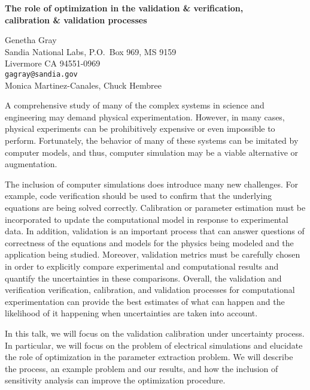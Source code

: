 \documentclass{report}
\begin{document}

\begin{center}
{\large
{\bf The role of optimization in the validation \& verification, \\
calibration \& validation processes}}

	Genetha Gray \\
	Sandia National Labs, P.O.~Box 969, MS 9159 \\
	Livermore CA 94551-0969 \\
	{\tt gagray@sandia.gov} \\
	Monica Martinez-Canales, Chuck Hembree
\end{center}
A comprehensive study of many of the complex systems in
science and engineering may demand physical experimentation.
However, in many cases, physical experiments can be
prohibitively expensive or even impossible to perform.
Fortunately, the behavior of many of these systems can be
imitated by computer models, and thus, computer simulation
may be a viable alternative or augmentation.

 The
inclusion of computer simulations does introduce many new
challenges. For example, code verification should be used to
confirm that the underlying equations are being solved
correctly. Calibration or parameter estimation must be
incorporated to update the computational model in response
to experimental data. In addition, validation is an
important process that can answer questions of correctness
of the equations and models for the physics being modeled
and the application being studied. Moreover, validation
metrics must be carefully chosen in order to explicitly
compare experimental and computational results and quantify
the uncertainties in these comparisons. Overall, the
validation and verification verification, calibration, and
validation processes for computational experimentation can
provide the best estimates of what can happen and the
likelihood of it happening when uncertainties are taken into
account.

 In this talk, we will focus on the validation
calibration under uncertainty process. In particular, we
will focus on the problem of electrical simulations and
elucidate the role of optimization in the parameter
extraction problem. We will describe the process, an example
problem and our results, and how the inclusion of
sensitivity analysis can improve the optimization procedure.



\end{document}
